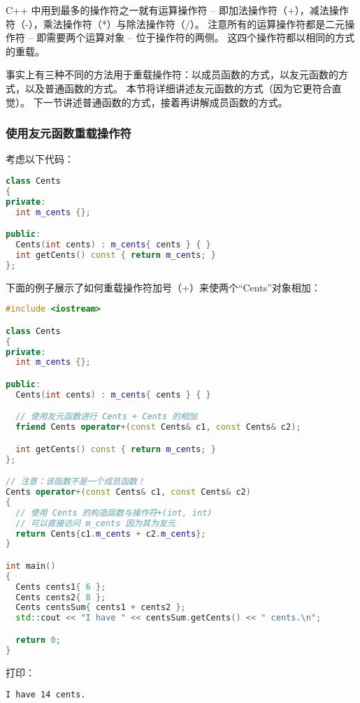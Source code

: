 \documentclass[../../LearnCpp.tex]{subfiles}
\begin{document}

C++ 中用到最多的操作符之一就有运算操作符 -- 即加法操作符（+），减法操作符（-），乘法操作符（*）与除法操作符（/）。
注意所有的运算操作符都是二元操作符 -- 即需要两个运算对象 -- 位于操作符的两侧。
这四个操作符都以相同的方式的重载。

事实上有三种不同的方法用于重载操作符：以成员函数的方式，以友元函数的方式，以及普通函数的方式。
本节将详细讲述友元函数的方式（因为它更符合直觉）。
下一节讲述普通函数的方式，接着再讲解成员函数的方式。

\subsubsection*{使用友元函数重载操作符}

考虑以下代码：

\begin{lstlisting}[language=C++]
class Cents
{
private:
  int m_cents {};

public:
  Cents(int cents) : m_cents{ cents } { }
  int getCents() const { return m_cents; }
};
\end{lstlisting}

下面的例子展示了如何重载操作符加号（+）来使两个“Cents”对象相加：

\begin{lstlisting}[language=C++]
#include <iostream>

class Cents
{
private:
  int m_cents {};

public:
  Cents(int cents) : m_cents{ cents } { }

  // 使用友元函数进行 Cents + Cents 的相加
  friend Cents operator+(const Cents& c1, const Cents& c2);

  int getCents() const { return m_cents; }
};

// 注意：该函数不是一个成员函数！
Cents operator+(const Cents& c1, const Cents& c2)
{
  // 使用 Cents 的构造函数与操作符+(int, int)
  // 可以直接访问 m_cents 因为其为友元
  return Cents{c1.m_cents + c2.m_cents};
}

int main()
{
  Cents cents1{ 6 };
  Cents cents2{ 8 };
  Cents centsSum{ cents1 + cents2 };
  std::cout << "I have " << centsSum.getCents() << " cents.\n";

  return 0;
}
\end{lstlisting}

打印：

\begin{lstlisting}
I have 14 cents.
\end{lstlisting}
\end{document}
